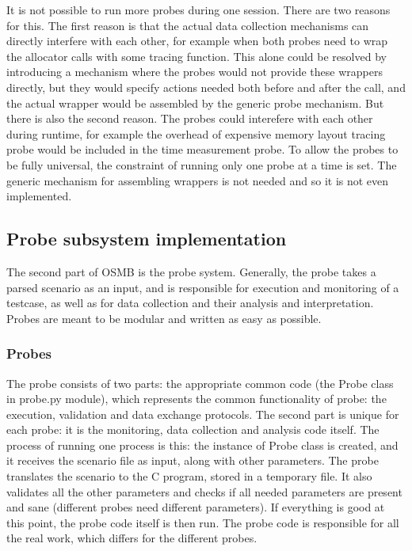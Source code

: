 It is not possible to run more probes during one session. There are two reasons for this. The first reason is that the actual data collection mechanisms can directly interfere with each other, for example when both probes need to wrap the allocator calls with some tracing function. This alone could be resolved by introducing a mechanism where the probes would not provide these wrappers directly, but they would specify actions needed both before and after the call, and the actual wrapper would be assembled by the generic probe mechanism. But there is also the second reason. The probes could interefere with each other during runtime, for example the overhead of expensive memory layout tracing probe would be included in the time measurement probe. To allow the probes to be fully universal, the constraint of running only one probe at a time is set. The generic mechanism for assembling wrappers is not needed and so it is not even implemented.

\subsection{Probe subsystem implementation}
The second part of OSMB is the probe system. Generally, the probe takes a parsed scenario as an input, and is responsible for execution and monitoring of a testcase, as well as for data collection and their analysis and interpretation. Probes are meant to be modular and written as easy as possible.

\subsubsection{Probes}
The probe consists of two parts: the appropriate common code (the Probe class in probe.py module), which represents the common functionality of probe: the execution, validation and data exchange protocols. The second part is unique for each probe: it is the monitoring, data collection and analysis code itself. The process of running one process is this: the instance of Probe class is created, and it receives the scenario file as input, along with other parameters. The probe translates the scenario to the C program, stored in a temporary file. It also validates all the other parameters and checks if all needed parameters are present and sane (different probes need different parameters). If everything is good at this point, the probe code itself is then run. The probe code is responsible for all the real work, which differs for the different probes.

